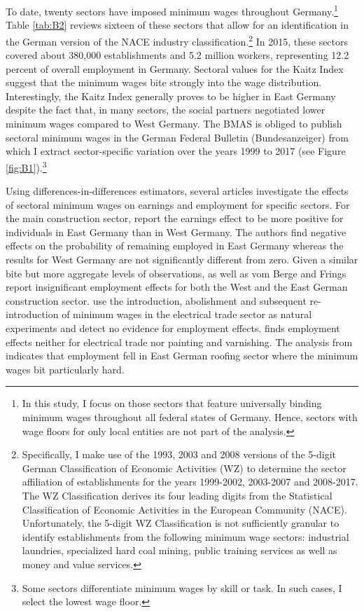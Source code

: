 \documentclass[11pt,oneside,reqno,xcolor=dvipsnames]{article} %
\begin{document}
To date, twenty sectors have imposed minimum wages throughout Germany.\footnote{In this study, I focus on those sectors that feature universally binding minimum wages throughout all federal states of Germany. Hence, sectors with wage floors for only local entities are not part of the analysis.} Table \ref{tab:B2} reviews sixteen of these sectors that allow for an identification in the German version of the NACE industry classification.\footnote{Specifically, I make use of the 1993, 2003 and 2008 versions of the 5-digit German Classification of Economic Activities (WZ) to determine the sector affiliation of establishments for the years 1999-2002, 2003-2007 and 2008-2017. The WZ Classification derives its four leading digits from the Statistical Classification of Economic Activities in the European Community (NACE). Unfortunately, the 5-digit WZ Classification is not sufficiently granular to identify establishments from the following minimum wage sectors: industrial laundries, specialized hard coal mining, public training services as well as money and value services.} In 2015, these sectors covered about 380,000 establishments and 5.2 million workers, representing 12.2 percent of overall employment in Germany. Sectoral values for the Kaitz Index suggest that the minimum wages bite strongly into the wage distribution. Interestingly, the Kaitz Index generally proves to be higher in East Germany despite the fact that, in many sectors, the social partners negotiated lower minimum wages compared to West Germany. The BMAS is obliged to publish sectoral minimum wages in the German Federal Bulletin (Bundesanzeiger) from which I extract sector-specific variation over the years 1999 to 2017 (see Figure \ref{fig:B1}).\footnote{Some sectors differentiate minimum wages by skill or task. In such cases, I select the lowest wage floor.}

Using differences-in-differences estimators, several articles investigate the effects of sectoral minimum wages on earnings and employment for specific sectors. For the main construction sector, \citet{KoenigMoeller2009} report the earnings effect to be more positive for individuals in East Germany than in West Germany. The authors find negative effects on the probability of remaining employed in East Germany whereas the results for West Germany are not significantly different from zero. Given a similar bite but more aggregate levels of observations, \citet{Rattenhuber2014} as well as vom Berge and Frings \citeyearpar{vomBergeFrings2020} report insignificant employment effects for both the West and the East German construction sector. \citet{BoockmannEtAl2013} use the introduction, abolishment and subsequent re-introduction of minimum wages in the electrical trade sector as natural experiments and detect no evidence for employment effects. \citet{Frings2013} finds employment effects neither for electrical trade nor painting and varnishing. The analysis from \citet{AretzEtAl2013} indicates that employment fell in East German roofing sector where the minimum wages bit particularly hard.
\end{document}
